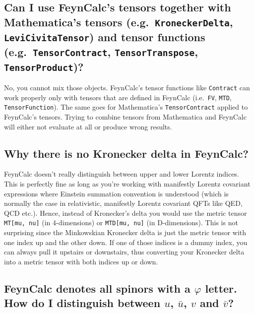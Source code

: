 \documentclass[../FeynCalcManual.tex]{subfiles}
\begin{document}
\subsection{\texorpdfstring{Can I use FeynCalc's tensors together with
Mathematica's tensors (e.g.~\texttt{KroneckerDelta},
\texttt{LeviCivitaTensor}) and tensor functions
(e.g.~\texttt{TensorContract}, \texttt{TensorTranspose},
\texttt{TensorProduct})?}{Can I use FeynCalc's tensors together with Mathematica's tensors (e.g.~, ) and tensor functions (e.g.~, , )?}}\label{can-i-use-feyncalcs-tensors-together-with-mathematicas-tensors-e.g.-kroneckerdelta-levicivitatensor-and-tensor-functions-e.g.-tensorcontract-tensortranspose-tensorproduct}

No, you cannot mix those objects. FeynCalc's tensor functions like
\texttt{Contract} can work properly only with tensors that are defined
in FeynCalc (i.e.~\texttt{FV}, \texttt{MTD}, \texttt{TensorFunction}).
The same goes for Mathematica's \texttt{TensorContract} applied to
FeynCalc's tensors. Trying to combine tensors from Mathematica and
FeynCalc will either not evaluate at all or produce wrong results.

\subsection{Why there is no Kronecker delta in
FeynCalc?}\label{why-there-is-no-kronecker-delta-in-feyncalc}

FeynCalc doesn't really distinguish between upper and lower Lorentz
indices. This is perfectly fine as long as you're working with
manifestly Lorentz covariant expressions where Einstein summation
convention is understood (which is normally the case in relativistic,
manifestly Lorentz covariant QFTs like QED, QCD etc.). Hence, instead of
Kronecker's delta you would use the metric tensor
\texttt{MT[\allowbreak{}mu,\ \allowbreak{}nu]} (in 4-dimensions) or
\texttt{MTD[\allowbreak{}mu,\ \allowbreak{}nu]} (in D-dimensions). This
is not surprising since the Minkowskian Kronecker delta is just the
metric tensor with one index up and the other down. If one of those
indices is a dummy index, you can always pull it upstairs or downstairs,
thus converting your Kronecker delta into a metric tensor with both
indices up or down.

\subsection{\texorpdfstring{FeynCalc denotes all spinors with a
\(\varphi\) letter. How do I distinguish between \(u\), \(\bar{u}\),
\(v\) and
\(\bar{v}\)?}{FeynCalc denotes all spinors with a \textbackslash varphi letter. How do I distinguish between u, \textbackslash bar\{u\}, v and \textbackslash bar\{v\}?}}\label{feyncalc-denotes-all-spinors-with-a-varphi-letter.-how-do-i-distinguish-between-u-baru-v-and-barv}
\end{document}

